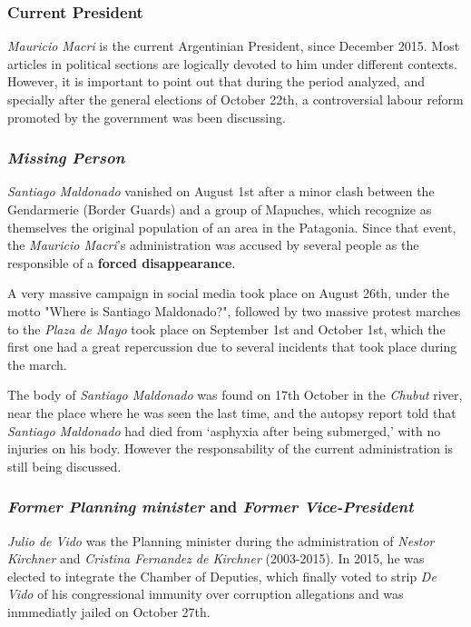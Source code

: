 \documentclass[a4paper, 12pt]{article}
\begin{document}
\subsubsection{Current President}
\par \emph{Mauricio Macri} is the current Argentinian President, since December 2015. 
Most articles in political sections are logically devoted to him under different contexts.
However, it is important to point out that during the period analyzed, and specially after the general elections of October 22th, a controversial labour reform promoted by the government was been discussing.

\subsubsection{\emph{Missing Person}}
\par \emph{Santiago Maldonado} vanished on August 1st after a minor clash between the Gendarmerie (Border Guards) and a group of Mapuches, which recognize as themselves the original population of an area in the Patagonia.
Since that event, the \emph{Mauricio Macri}'s administration was accused by several people as the responsible of a \textbf{forced disappearance}. 
\par A very massive campaign in social media took place on August 26th, under the motto "Where is Santiago Maldonado?", followed by two massive protest marches to the \emph{Plaza de Mayo} took place on September 1st and October 1st, which the first one had a great repercussion due to several incidents that took place during the march.
\par The body of \emph{Santiago Maldonado} was found on 17th October in the \emph{Chubut} river, near the place where he was seen the last time, and the autopsy report told that \emph{Santiago Maldonado} had died from ‘asphyxia after being submerged,’ with no injuries on his body. 
However the responsability of the current administration is still being discussed.

\subsubsection{\emph{Former Planning minister} and \emph{Former Vice-President}}

\par \emph{Julio de Vido} was the Planning minister during the administration of \emph{Nestor Kirchner} and \emph{Cristina Fernandez de Kirchner} (2003-2015). In 2015, he was elected to integrate the Chamber of Deputies, which finally voted to strip \emph{De Vido} of his congressional immunity over corruption allegations and was inmmediatly jailed on October 27th.
\end{document}
